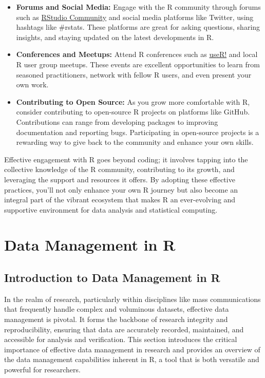 \documentclass[
]{book}
\begin{document}
\begin{itemize}
\item
  \textbf{Forums and Social Media:} Engage with the R community through forums such as \href{https://community.rstudio.com/}{RStudio Community} and social media platforms like Twitter, using hashtags like \#rstats. These platforms are great for asking questions, sharing insights, and staying updated on the latest developments in R.
\item
  \textbf{Conferences and Meetups:} Attend R conferences such as \href{https://user2020.r-project.org/}{useR!} and local R user group meetups. These events are excellent opportunities to learn from seasoned practitioners, network with fellow R users, and even present your own work.
\item
  \textbf{Contributing to Open Source:} As you grow more comfortable with R, consider contributing to open-source R projects on platforms like GitHub. Contributions can range from developing packages to improving documentation and reporting bugs. Participating in open-source projects is a rewarding way to give back to the community and enhance your own skills.
\end{itemize}

Effective engagement with R goes beyond coding; it involves tapping into the collective knowledge of the R community, contributing to its growth, and leveraging the support and resources it offers. By adopting these effective practices, you'll not only enhance your own R journey but also become an integral part of the vibrant ecosystem that makes R an ever-evolving and supportive environment for data analysis and statistical computing.

\hypertarget{data-management-in-r}{%
\chapter{Data Management in R}\label{data-management-in-r}}

\hypertarget{introduction-to-data-management-in-r}{%
\section{Introduction to Data Management in R}\label{introduction-to-data-management-in-r}}

In the realm of research, particularly within disciplines like mass communications that frequently handle complex and voluminous datasets, effective data management is pivotal. It forms the backbone of research integrity and reproducibility, ensuring that data are accurately recorded, maintained, and accessible for analysis and verification. This section introduces the critical importance of effective data management in research and provides an overview of the data management capabilities inherent in R, a tool that is both versatile and powerful for researchers.
\end{document}
